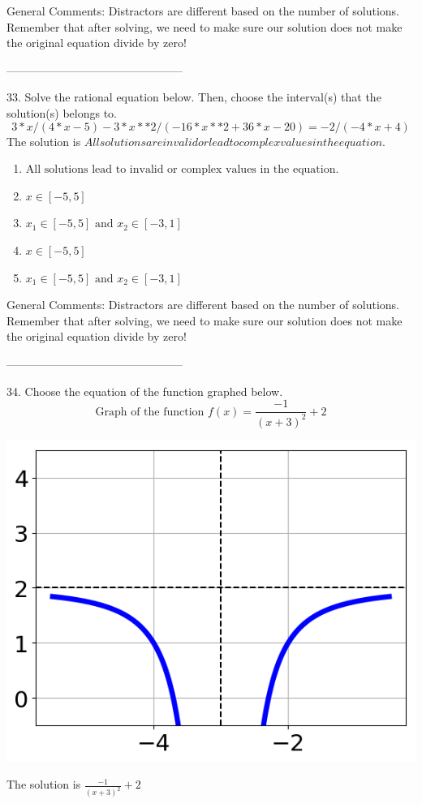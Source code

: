 \documentclass{article}[10pt]
\begin{document}
General Comments: Distractors are different based on the number of solutions. Remember that after solving, we need to make sure our solution does not make the original equation divide by zero!

-----------------------------------------------

33. Solve the rational equation below. Then, choose the interval(s) that the solution(s) belongs to.
$$ 3*x/(4*x - 5) - 3*x**2/(-16*x**2 + 36*x - 20) = -2/(-4*x + 4) $$ 
The solution is $ All solutions are invalid or lead to complex values in the equation. $ 

\begin{enumerate}[label=\Alph*.] 
\item $ \text{All solutions lead to invalid or complex values in the equation.} $ 

  
\item $ x \in [-5,5] $ 

  
\item $ x_1 \in [-5, 5] \text{ and } x_2 \in [-3,1] $ 

  
\item $ x \in [-5,5] $ 

  
\item $ x_1 \in [-5, 5] \text{ and } x_2 \in [-3,1] $ 

  
\end{enumerate} 
 
General Comments: Distractors are different based on the number of solutions. Remember that after solving, we need to make sure our solution does not make the original equation divide by zero!

-----------------------------------------------

34. Choose the equation of the function graphed below.
$$ \text{Graph of the function } f(x) = \frac{-1}{(x + 3)^2} + 2 $$ 
\begin{center}\includegraphics[scale=0.5]{../Figures/question34MU.png}\end{center}The solution is $ \frac{-1}{(x + 3)^2} + 2 $ 
\end{document}
